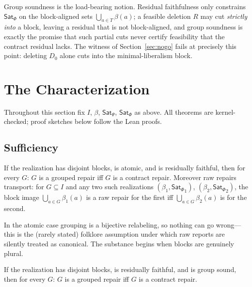 \documentclass[sigplan,10pt,review,anonymous,nonacm]{acmart}
\theoremstyle{acmdefinition}
\newcommand{\SatPsi}{{\mathsf{Sat}_\Psi}}
\newcommand{\SatPhi}{{\mathsf{Sat}_\Phi}}
\begin{document}
Group soundness is the load-bearing notion. Residual faithfulness only
constrains $\SatPhi$ on the block-aligned sets $\bigcup_{a \in T} \beta(a)$;
a feasible deletion $R$ may cut \emph{strictly into} a block, leaving a
residual that is not block-aligned, and group soundness is exactly the promise
that such partial cuts never certify feasibility that the contract residual
lacks. The witness of Section~\ref{sec:nogo} fails at precisely this point:
deleting $D_0$ alone cuts into the minimal-liberalism block.

\section{The Characterization}
\label{sec:char}

Throughout this section fix $I$, $\beta$, $\SatPsi$, $\SatPhi$ as above.
All
theorems are kernel-checked; proof sketches below follow the Lean proofs.

\subsection{Sufficiency}

\begin{theorem}
\label{thm:atomic}
If the realization has disjoint blocks, is atomic, and is residually
faithful, then for every $G$: $G$ is a grouped repair iff $G$ is a contract
repair. Moreover raw repairs transport: for $G \subseteq I$ and any two such
realizations $(\beta_1,\SatPhi_1)$, $(\beta_2,\SatPhi_2)$, the block image
$\bigcup_{a\in G}\beta_1(a)$ is a raw repair for the first iff
$\bigcup_{a\in G}\beta_2(a)$ is for the second.
\end{theorem}

In the atomic case grouping is a bijective relabeling, so nothing can go
wrong---this is the (rarely stated) folklore assumption under which raw
reports are silently treated as canonical. The substance begins when blocks
are genuinely plural.

\begin{theorem}
\label{thm:suff}
If the realization has disjoint blocks, is residually faithful, and is group
sound, then for every $G$: $G$ is a grouped repair iff $G$ is a contract
repair.
\end{theorem}
\end{document}
